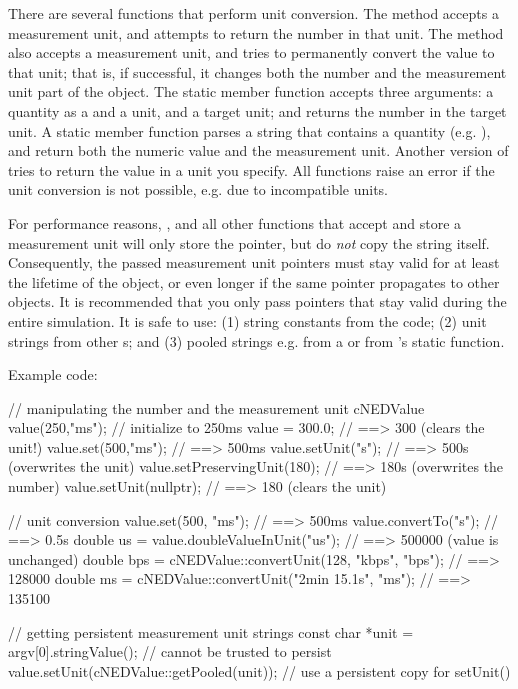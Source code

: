 There are several functions that perform unit conversion. The
 method accepts a measurement unit, and attempts
to return the number in that unit. The  method also
accepts a measurement unit, and tries to permanently convert the value to
that unit; that is, if successful, it changes both the number and the
measurement unit part of the object. The  static
 member function accepts three arguments: a quantity as a
 and a unit, and a target unit; and returns the number in the
target unit. A  static member function parses
a string that contains a quantity (e.g. ), and return
both the numeric value and the measurement unit. Another version of
 tries to return the value in a unit you specify.
All functions raise an error if the unit conversion is not possible, e.g.
due to incompatible units.

For performance reasons, ,  and all other
functions that accept and store a measurement unit will only store the
 pointer, but do \textit{not} copy the string itself.
Consequently, the passed measurement unit pointers must stay valid for at
least the lifetime of the  object, or even longer if the
same pointer propagates to other  objects. It is
recommended that you only pass pointers that stay valid during the entire
simulation. It is safe to use: (1) string constants from the code; (2) unit
strings from other s; and (3) pooled strings e.g. from a
 or from 's static 
function.

Example code:

\begin{cpp}
// manipulating the number and the measurement unit
cNEDValue value(250,"ms");    // initialize to 250ms
value = 300.0;                // ==> 300 (clears the unit!)
value.set(500,"ms");          // ==> 500ms
value.setUnit("s");           // ==> 500s (overwrites the unit)
value.setPreservingUnit(180); // ==> 180s (overwrites the number)
value.setUnit(nullptr);       // ==> 180 (clears the unit)

// unit conversion
value.set(500, "ms");         // ==> 500ms
value.convertTo("s");         // ==> 0.5s
double us = value.doubleValueInUnit("us"); // ==> 500000 (value is unchanged)
double bps = cNEDValue::convertUnit(128, "kbps", "bps"); // ==> 128000
double ms = cNEDValue::convertUnit("2min 15.1s", "ms"); // ==> 135100

// getting persistent measurement unit strings
const char *unit = argv[0].stringValue(); // cannot be trusted to persist
value.setUnit(cNEDValue::getPooled(unit)); // use a persistent copy for setUnit()
\end{cpp}



